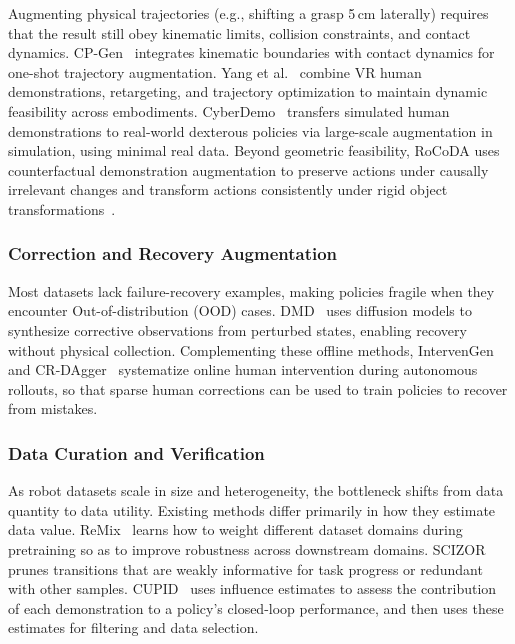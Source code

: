 \documentclass[acmsmall,screen,review]{acmart}
\begin{document}
Augmenting physical trajectories (e.g., shifting a grasp 5\,cm laterally) requires that the result still obey kinematic limits, collision constraints, and contact dynamics. 
CP-Gen~\cite{lin2025cpgen} integrates kinematic boundaries with contact dynamics for one-shot trajectory augmentation. 
Yang et al.~\cite{yang2025physicsdriven} combine VR human demonstrations, retargeting, and trajectory optimization to maintain dynamic feasibility across embodiments. 
CyberDemo~\cite{wang2024cyberdemo} transfers simulated human demonstrations to real-world dexterous policies via large-scale augmentation in simulation, using minimal real data.
Beyond geometric feasibility, RoCoDA uses counterfactual demonstration augmentation to preserve actions under causally irrelevant changes and transform actions consistently under rigid object transformations~\cite{ameperosa2025rocoda}.

\subsubsection{Correction and Recovery Augmentation}\label{sec:correction_recovery}

Most datasets lack failure-recovery examples, making policies fragile when they encounter Out-of-distribution (OOD) cases. 
DMD~\cite{zhang2024dmd} uses diffusion models to synthesize corrective observations from perturbed states, enabling recovery without physical collection. 
Complementing these offline methods, 
IntervenGen~\cite{pinto2024intervengen} and CR-DAgger~\cite{xu2025compliant} systematize online human intervention during autonomous rollouts, so that sparse human corrections can be used to train policies to recover from mistakes.

\subsubsection{Data Curation and Verification}\label{sec:data_curation}

As robot datasets scale in size and heterogeneity, the bottleneck shifts from data quantity to data utility.
Existing methods differ primarily in how they estimate data value. 
ReMix~\cite{hejna2025remix} learns how to weight different dataset domains during pretraining so as to improve robustness across downstream domains.
SCIZOR~\cite{zhang2025scizor} prunes transitions that are weakly informative for task progress or redundant with other samples.
CUPID~\cite{agia2025cupidcuratingdatarobot} uses influence estimates to assess the contribution of each demonstration to a policy's closed-loop performance, and then uses these estimates for filtering and data selection.
\end{document}
